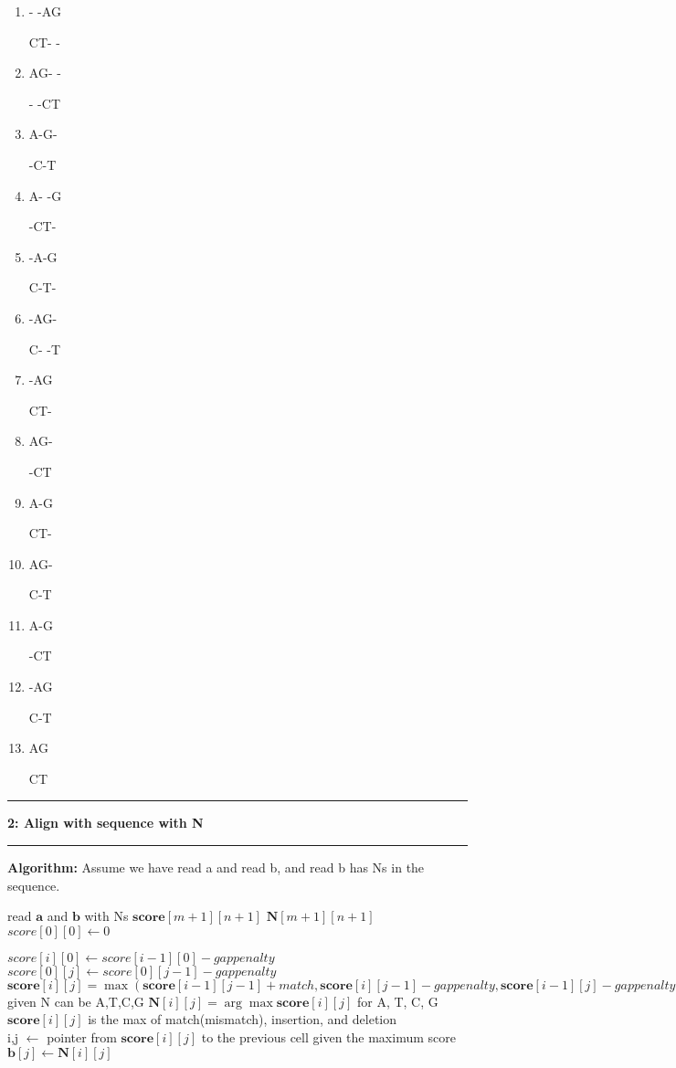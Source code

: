 \documentclass[11pt]{article}
\newcommand\question[2]{\vspace{.25in}\hrule\textbf{#1: #2}\vspace{.5em}\hrule\vspace{.10in}}
\newcommand\algorithmcode{\vspace{.10in}\textbf{Algorithm: }}
\begin{document}
\begin{enumerate}
	\item - -AG
	
	CT- -
	\item AG- -

    - -CT
	\item A-G-

    -C-T
	\item A- -G

    -CT-
	\item -A-G

    C-T-
	\item -AG-

    C- -T
	\item-AG

    CT-
	\item AG-

    -CT
	\item A-G

    CT-
	\item AG-

    C-T
	\item A-G
	
	-CT
	\item -AG
	
	C-T
    \item AG
    
    CT
	
\end{enumerate}

\question{2}{Align with sequence with N}

\algorithmcode Assume we have read a and read b, and read b has Ns in the sequence.


\begin{algorithmic}
	\State read $ \mathbf{a} $ and $ \mathbf{b} $ with Ns
	\State $\mathbf{score}[m+1][n+1]$ 
	\State $ \mathbf{N}[m+1][n+1] $ 
	\\
	\State $score[0][0] \gets 0$
	
		\State$  score[i][0] \gets score[i-1][0] - gappenalty $
	\EndFor
	\State$  score[0][j] \gets score[0][j-1] - gappenalty $
	\EndFor
	\\
			\State $\mathbf{score}[i][j] = \max (\mathbf{score}[i-1][j-1] + match, \mathbf{score}[i][j-1] -gappenalty, \mathbf{score}[i-1][j] -gappenalty )$ given N can be A,T,C,G
			\State $ \mathbf{N}[i][j]=\arg \max\mathbf{score}[i][j]  $ for A, T, C, G
			\Else
			\State $\mathbf{score}[i][j]$ is the max of match(mismatch), insertion, and deletion
			\EndIf
		\EndFor
	\EndFor
	\\
	\State i,j $ \gets $ pointer from $ \mathbf{score}[i][j] $ to the previous cell given the maximum score
	\State $ \mathbf{b}[j] \gets \mathbf{N}[i][j] $
	\EndIf
	\EndWhile

\end{algorithmic}
\end{document}
